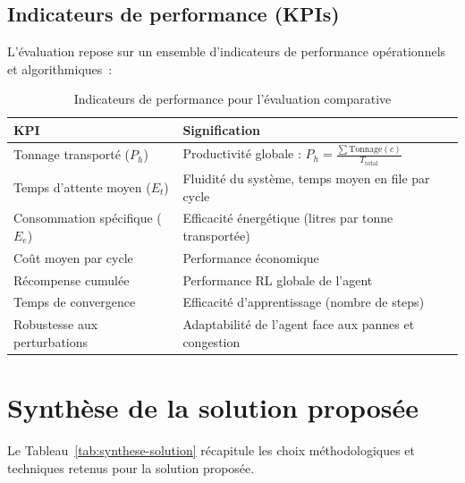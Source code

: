 \documentclass[11pt,a4paper]{report}
\begin{document}
\subsection{Indicateurs de performance (KPIs)}
\label{sec:kpis}
L'évaluation repose sur un ensemble d'indicateurs de performance opérationnels et algorithmiques~:

\begin{table}[H]
\centering
\caption{Indicateurs de performance pour l'évaluation comparative}
\label{tab:kpis}
\begin{tabular}{lp{9cm}}
\toprule
\textbf{KPI} & \textbf{Signification} \\
\midrule
Tonnage transporté ($P_h$) & Productivité globale : $P_h = \frac{\sum \text{Tonnage}(c)}{T_{\text{total}}}$ \\
Temps d'attente moyen ($E_t$) & Fluidité du système, temps moyen en file par cycle \\
Consommation spécifique ($E_e$) & Efficacité énergétique (litres par tonne transportée) \\
Coût moyen par cycle & Performance économique \\
Récompense cumulée & Performance RL globale de l'agent \\
Temps de convergence & Efficacité d'apprentissage (nombre de steps) \\
Robustesse aux perturbations & Adaptabilité de l'agent face aux pannes et congestion \\
\bottomrule
\end{tabular}
\end{table}

\section{Synthèse de la solution proposée}
\label{sec:synthese-solution}

Le Tableau~\ref{tab:synthese-solution} récapitule les choix méthodologiques et techniques retenus pour la solution proposée.
\end{document}
